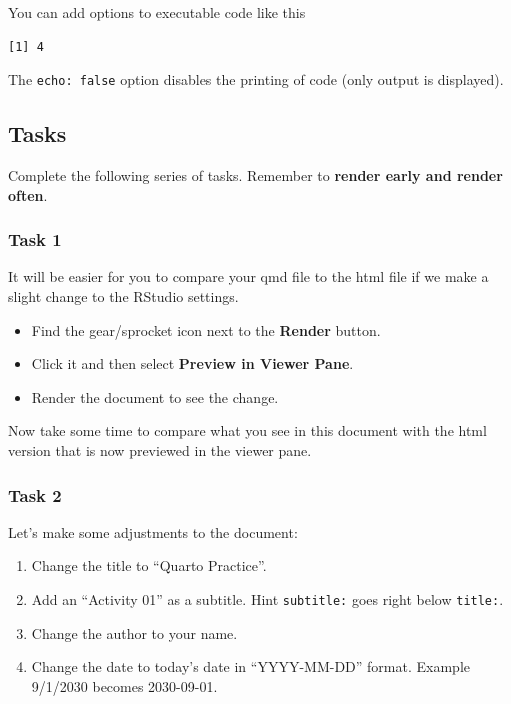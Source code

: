 \documentclass[
  letterpaper,
  DIV=11,
  numbers=noendperiod]{scrreprt}
\providecommand{\tightlist}{%
  \setlength{\itemsep}{0pt}\setlength{\parskip}{0pt}}\usepackage{longtable,booktabs,array}
\begin{document}
You can add options to executable code like this

\begin{verbatim}
[1] 4
\end{verbatim}

The \texttt{echo:\ false} option disables the printing of code (only
output is displayed).

\hypertarget{tasks}{%
\subsection*{Tasks}\label{tasks}}

Complete the following series of tasks. Remember to \textbf{render early
and render often}.

\hypertarget{task-1}{%
\subsubsection*{Task 1}\label{task-1}}

It will be easier for you to compare your qmd file to the html file if
we make a slight change to the RStudio settings.

\begin{itemize}
\tightlist
\item
  Find the gear/sprocket icon next to the \textbf{Render} button.
\item
  Click it and then select \textbf{Preview in Viewer Pane}.
\item
  Render the document to see the change.
\end{itemize}

Now take some time to compare what you see in this document with the
html version that is now previewed in the viewer pane.

\hypertarget{task-2-1}{%
\subsubsection*{Task 2}\label{task-2-1}}

Let's make some adjustments to the document:

\begin{enumerate}
\def\labelenumi{\arabic{enumi}.}
\tightlist
\item
  Change the title to ``Quarto Practice''.
\item
  Add an ``Activity 01'' as a subtitle. Hint \texttt{subtitle:} goes
  right below \texttt{title:}.
\item
  Change the author to your name.
\item
  Change the date to today's date in ``YYYY-MM-DD'' format. Example
  9/1/2030 becomes 2030-09-01.
\end{enumerate}
\end{document}
